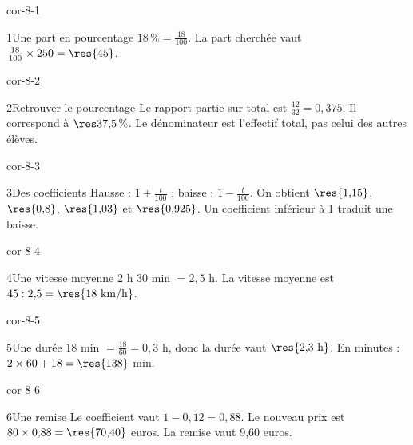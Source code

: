\clearpage\pagestyle{otMain}\setlength{\otBlocEspacement}{2.5mm}\fontsize{11}{15}\selectfont{}
\begin{blocLivre}{cor-8-1}\begin{corrige}{1}{Une part en pourcentage}
$18\,\%=\frac{18}{100}$. La part cherchée vaut $\frac{18}{100}\times250=\res{45}$.
\end{corrige}\end{blocLivre}
\begin{blocLivre}{cor-8-2}\begin{corrige}{2}{Retrouver le pourcentage}
Le rapport partie sur total est $\frac{12}{32}=0{,}375$. Il correspond à $\res{37{,}5\,\%}$. Le dénominateur est l’effectif total, pas celui des autres élèves.
\end{corrige}\end{blocLivre}
\begin{blocLivre}{cor-8-3}\begin{corrige}{3}{Des coefficients}
Hausse : $1+\frac{t}{100}$ ; baisse : $1-\frac{t}{100}$. On obtient $\res{1{,}15}$, $\res{0{,}8}$, $\res{1{,}03}$ et $\res{0{,}925}$. Un coefficient inférieur à 1 traduit une baisse.
\end{corrige}\end{blocLivre}
\begin{blocLivre}{cor-8-4}\begin{corrige}{4}{Une vitesse moyenne}
$2$ h $30$ min $=2{,}5$ h. La vitesse moyenne est $45:2{,}5=\res{18\ \mathrm{km/h}}$.
\end{corrige}\end{blocLivre}
\begin{blocLivre}{cor-8-5}\begin{corrige}{5}{Une durée}
$18$ min $=\frac{18}{60}=0{,}3$ h, donc la durée vaut $\res{2{,}3\ \mathrm h}$. En minutes : $2\times60+18=\res{138}$ min.
\end{corrige}\end{blocLivre}
\begin{blocLivre}{cor-8-6}\begin{corrige}{6}{Une remise}
Le coefficient vaut $1-0{,}12=0{,}88$. Le nouveau prix est $80\times0{,}88=\res{70{,}40}$ euros. La remise vaut 9,60 euros.
\end{corrige}\end{blocLivre}
